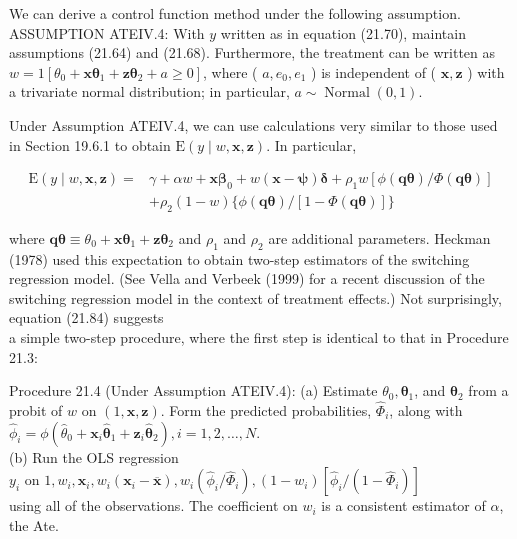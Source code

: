 \documentclass[10pt]{article}
\begin{document}
We can derive a control function method under the following assumption.\\
ASSUMPTION ATEIV.4: With $y$ written as in equation (21.70), maintain assumptions (21.64) and (21.68). Furthermore, the treatment can be written as $w=1\left[\theta_{0}+\mathbf{x} \boldsymbol{\theta}_{1}+\right. \left.\mathbf{z} \boldsymbol{\theta}_{2}+a \geq 0\right]$, where ( $a, e_{0}, e_{1}$ ) is independent of ( $\mathbf{x}, \mathbf{z}$ ) with a trivariate normal distribution; in particular, $a \sim \operatorname{Normal}(0,1)$.

Under Assumption ATEIV.4, we can use calculations very similar to those used in Section 19.6.1 to obtain $\mathrm{E}(y \mid w, \mathbf{x}, \mathbf{z})$. In particular,


\begin{align*}
\mathrm{E}(y \mid w, \mathbf{x}, \mathbf{z})= & \gamma+\alpha w+\mathbf{x} \boldsymbol{\beta}_{0}+w(\mathbf{x}-\boldsymbol{\psi}) \boldsymbol{\delta}+\rho_{1} w[\phi(\mathbf{q} \boldsymbol{\theta}) / \Phi(\mathbf{q} \boldsymbol{\theta})] \\
& +\rho_{2}(1-w)\{\phi(\mathbf{q} \boldsymbol{\theta}) /[1-\Phi(\mathbf{q} \boldsymbol{\theta})]\} \tag{21.84}
\end{align*}


where $\mathbf{q} \boldsymbol{\theta} \equiv \theta_{0}+\mathbf{x} \boldsymbol{\theta}_{1}+\mathbf{z} \boldsymbol{\theta}_{2}$ and $\rho_{1}$ and $\rho_{2}$ are additional parameters. Heckman (1978) used this expectation to obtain two-step estimators of the switching regression model. (See Vella and Verbeek (1999) for a recent discussion of the switching regression model in the context of treatment effects.) Not surprisingly, equation (21.84) suggests\\
a simple two-step procedure, where the first step is identical to that in Procedure 21.3:

Procedure 21.4 (Under Assumption ATEIV.4): (a) Estimate $\theta_{0}, \boldsymbol{\theta}_{1}$, and $\boldsymbol{\theta}_{2}$ from a probit of $w$ on $(1, \mathbf{x}, \mathbf{z})$. Form the predicted probabilities, $\hat{\Phi}_{i}$, along with $\hat{\phi}_{i}=\phi\left(\hat{\theta}_{0}+\right. \left.\mathbf{x}_{i} \hat{\boldsymbol{\theta}}_{1}+\mathbf{z}_{i} \hat{\boldsymbol{\theta}}_{2}\right), i=1,2, \ldots, N$.\\
(b) Run the OLS regression\\
$y_{i}$ on $1, w_{i}, \mathbf{x}_{i}, w_{i}\left(\mathbf{x}_{i}-\overline{\mathbf{x}}\right), w_{i}\left(\hat{\phi}_{i} / \hat{\Phi}_{i}\right),\left(1-w_{i}\right)\left[\hat{\phi}_{i} /\left(1-\hat{\Phi}_{i}\right)\right]$\\
using all of the observations. The coefficient on $w_{i}$ is a consistent estimator of $\alpha$, the Ate.
\end{document}
